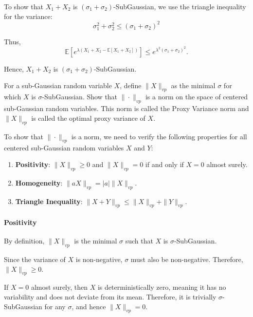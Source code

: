 \documentclass[a4 paper]{article}
\theoremstyle{boldStyle}
\theoremstyle{boldBlueStyle}
\theoremstyle{boldPurpleStyle}
\theoremstyle{boldRedStyle}
\begin{document}
\begin{enumerate}
To show that \(X_1 + X_2\) is \((\sigma_1 + \sigma_2)\)-SubGaussian, we use the triangle inequality for the variance:
\[
\sigma_1^2 + \sigma_2^2 \leq (\sigma_1 + \sigma_2)^2
\]

Thus,
\[
\mathbb{E}\left[e^{\lambda (X_1 + X_2 - \mathbb{E}[X_1 + X_2])}\right] \leq e^{\lambda^2 (\sigma_1 + \sigma_2)^2}.
\]

Hence, \(X_1 + X_2\) is \((\sigma_1 + \sigma_2)\)-SubGaussian.











\newpage
\textcolor{blueColor}{
\item For a sub-Gaussian random variable \(X\), define \(\|X\|_{vp}\) as the minimal \(\sigma\) for which \(X\) is \(\sigma\)-SubGaussian. 
Show that \(\|\cdot\|_{vp}\) is a norm on the space of centered sub-Gaussian random variables. This norm is called the Proxy Variance norm and \(\|X\|_{vp}\) 
is called the optimal proxy variance of \(X\).
}

\bigbreak

To show that \(\|\cdot\|_{vp}\) is a norm, we need to verify the following properties for all centered sub-Gaussian random variables \(X\) and \(Y\):
\begin{enumerate}
  \item \textbf{Positivity}: \(\|X\|_{vp} \geq 0\) and \(\|X\|_{vp} = 0\) if and only if \(X = 0\) almost surely.
  \item \textbf{Homogeneity}: \(\|aX\|_{vp} = |a| \|X\|_{vp}\).
  \item \textbf{Triangle Inequality}: \(\|X + Y\|_{vp} \leq \|X\|_{vp} + \|Y\|_{vp}\).
\end{enumerate}

\paragraph{Positivity} 

By definition, \(\|X\|_{vp}\) is the minimal \(\sigma\) such that \(X\) is \(\sigma\)-SubGaussian. 

Since the variance of \(X\) is non-negative, \(\sigma\) must also be non-negative. Therefore, \(\|X\|_{vp} \geq 0\). 


If \(X = 0\) almost surely, then \(X\) is deterministically zero, meaning it has no variability and does not deviate from its mean. 
Therefore, it is trivially \(\sigma\)-SubGaussian for any \(\sigma\), and hence \(\|X\|_{vp} = 0\). 


\end{enumerate}
\end{document}

